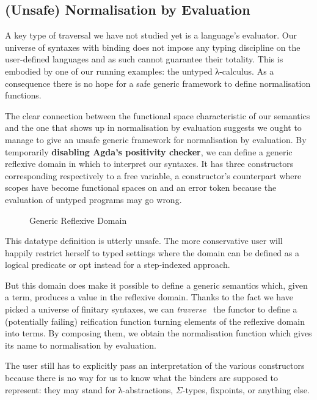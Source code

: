 \subsection{(Unsafe) Normalisation by Evaluation}\label{section:nbyeval}

A key type of traversal we have not studied yet is a language's
evaluator. Our universe of syntaxes with binding does not impose
any typing discipline on the user-defined languages and as such
cannot guarantee their totality. This is embodied by one of our running
examples: the untyped λ-calculus. As a consequence there
is no hope for a safe generic framework to define normalisation
functions.

The clear connection between the  functional space
characteristic of our semantics and the one that shows up in
normalisation by evaluation suggests we ought to manage to
give an unsafe generic framework for normalisation by evaluation.
By temporarily \textbf{disabling Agda's positivity checker},
we can define a generic reflexive domain  in which to
interpret our syntaxes. It has three constructors corresponding
respectively to a free variable, a constructor's counterpart where
scopes have become  functional spaces on  and
an error token because the evaluation of untyped programs may go wrong.

\begin{figure}[h]
\caption{Generic Reflexive Domain}
\end{figure}

This datatype definition is utterly unsafe. The more conservative
user will happily restrict herself to typed settings where the
domain can be defined as a logical predicate or opt instead for
a step-indexed approach.

But this domain does make it possible to define a generic 
semantics which, given a term, produces a value in the reflexive
domain. Thanks to the fact we have picked a universe of finitary syntaxes, we
can \emph{traverse}~\cite{mcbride_paterson_2008} the functor to define
a (potentially failing) reification function turning elements of the
reflexive domain into terms. By composing them, we obtain the
normalisation function which gives its name to normalisation by
evaluation.

The user still has to explicitly pass an interpretation of
the various constructors because there is no way for us to
know what the binders are supposed to represent: they may
stand for λ-abstractions, $\Sigma$-types, fixpoints, or
anything else.

